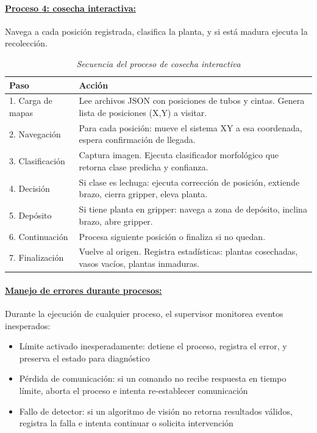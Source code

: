 \paragraph{\underline{Proceso 4: cosecha interactiva:}}

Navega a cada posición registrada, clasifica la planta, y si está madura ejecuta la recolección.

\begin{table}[H]
\centering
\small
\begin{tabular}{|l|p{10cm}|}
\hline
Paso & Acción \\
\hline
1. Carga de mapas & Lee archivos JSON con posiciones de tubos y cintas. Genera lista de posiciones (X,Y) a visitar. \\
\hline
2. Navegación & Para cada posición: mueve el sistema XY a esa coordenada, espera confirmación de llegada. \\
\hline
3. Clasificación & Captura imagen. Ejecuta clasificador morfológico que retorna clase predicha y confianza. \\
\hline
4. Decisión & Si clase es lechuga: ejecuta corrección de posición, extiende brazo, cierra gripper, eleva planta. \\
\hline
5. Depósito & Si tiene planta en gripper: navega a zona de depósito, inclina brazo, abre gripper. \\
\hline
6. Continuación & Procesa siguiente posición o finaliza si no quedan. \\
\hline
7. Finalización & Vuelve al origen. Registra estadísticas: plantas cosechadas, vasos vacíos, plantas inmaduras. \\
\hline
\end{tabular}
\caption{\textit{Secuencia del proceso de cosecha interactiva}}
\label{tab:proceso_cosecha}
\end{table}

\paragraph{\underline{Manejo de errores durante procesos:}}

Durante la ejecución de cualquier proceso, el supervisor monitorea eventos inesperados:

\begin{itemize}[label=$\bullet$]
    \item Límite activado inesperadamente: detiene el proceso, registra el error, y preserva el estado para diagnóstico
    \item Pérdida de comunicación: si un comando no recibe respuesta en tiempo límite, aborta el proceso e intenta re-establecer comunicación
    \item Fallo de detector: si un algoritmo de visión no retorna resultados válidos, registra la falla e intenta continuar o solicita intervención
\end{itemize}

